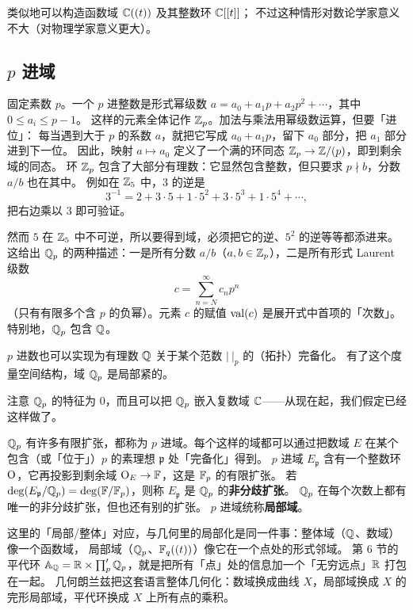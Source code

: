 类似地可以构造函数域 $\mathbb{C}((t))$ 及其整数环 $\mathbb{C}[[t]]$；
不过这种情形对数论学家意义不大（对物理学家意义更大）。

\subsection{$p$ 进域}

固定素数 $p$。一个 $p$ 进整数是形式幂级数 $a=a_0+a_1p+a_2p^2+\cdots$，其中 $0\le a_i\le p-1$。
这样的元素全体记作 $\mathbb{Z}_p$。加法与乘法用幂级数运算，但要「进位」：
每当遇到大于 $p$ 的系数 $a$，就把它写成 $a_0+a_1p$，留下 $a_0$ 部分，把 $a_1$ 部分进到下一位。
因此，映射 $a\mapsto a_0$ 定义了一个满的环同态 $\mathbb{Z}_p\to\mathbb{Z}/(p)$，即到剩余域的同态。
环 $\mathbb{Z}_p$ 包含了大部分有理数：它显然包含整数，但只要求 $p\nmid b$，分数 $a/b$ 也在其中。
例如在 $\mathbb{Z}_5$ 中，$3$ 的逆是
\[
3^{-1}=2+3\cdot 5+1\cdot 5^2+3\cdot 5^3+1\cdot 5^4+\cdots,
\]
把右边乘以 $3$ 即可验证。

然而 $5$ 在 $\mathbb{Z}_5$ 中不可逆，所以要得到域，必须把它的逆、$5^2$ 的逆等等都添进来。
这给出 $\mathbb{Q}_p$ 的两种描述：一是所有分数 $a/b$（$a,b\in\mathbb{Z}_p$），二是所有形式 Laurent 级数
\[
c=\sum_{n=N}^{\infty}c_np^n
\]
（只有有限多个含 $p$ 的负幂）。元素 $c$ 的赋值 $\mathrm{val}(c)$ 是展开式中首项的「次数」。
特别地，$\mathbb{Q}_p$ 包含 $\mathbb{Q}$。

$p$ 进数也可以实现为有理数 $\mathbb{Q}$ 关于某个范数 $|\ |_p$ 的（拓扑）完备化。
有了这个度量空间结构，域 $\mathbb{Q}_p$ 是局部紧的。

注意 $\mathbb{Q}_p$ 的特征为 $0$，而且可以把 $\mathbb{Q}_p$ 嵌入复数域 $\mathbb{C}$——从现在起，我们假定已经这样做了。

$\mathbb{Q}_p$ 有许多有限扩张，都称为 $p$ 进域。每个这样的域都可以通过把数域 $E$ 在某个包含（或「位于」）$p$ 的素理想 $\mathfrak p$ 处「完备化」得到。
$p$ 进域 $E_{\mathfrak p}$ 含有一个整数环 $\mathrm{O}$，它再投影到剩余域 $\mathrm{O}_E\to\mathbb{F}$，这是 $\mathbb{F}_p$ 的有限扩张。
若 $\deg(E_{\mathfrak p}/\mathbb{Q}_p)=\deg(\mathbb{F}/\mathbb{F}_p)$，则称 $E_{\mathfrak p}$ 是 $\mathbb{Q}_p$ 的\textbf{非分歧扩张}。
$\mathbb{Q}_p$ 在每个次数上都有唯一的非分歧扩张，但也还有别的扩张。
$p$ 进域统称\textbf{局部域}。

\begin{yizhu}[两种「局部」与两种「整体」]
这里的「局部/整体」对应，与几何里的局部化是同一件事：整体域（$\mathbb{Q}$、数域）像一个函数域，
局部域（$\mathbb{Q}_p$、$\mathbb{F}_q((t))$）像它在一个点处的形式邻域。
第 6 节的平代环 $\mathbb{A}_{\mathbb{Q}}=\mathbb{R}\times\prod'_p\mathbb{Q}_p$，就是把所有「点」处的信息加一个「无穷远点」$\mathbb{R}$ 打包在一起。
几何朗兰兹把这套语言整体几何化：数域换成曲线 $X$，局部域换成 $X$ 的完形局部域，平代环换成 $X$ 上所有点的乘积。
\end{yizhu}

